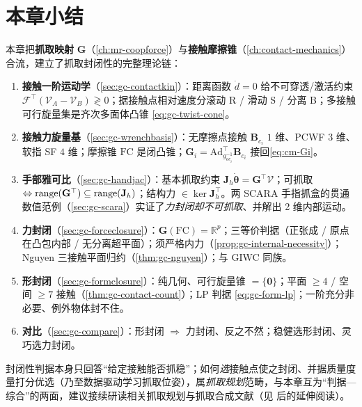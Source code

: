 \section*{本章小结}
本章把\textbf{抓取映射} $\mathbf{G}$（\cref{ch:mr-coopforce}）与\textbf{接触摩擦锥}（\cref{ch:contact-mechanics}）合流，建立了抓取封闭性的完整理论链：
\begin{enumerate}
  \item \textbf{接触一阶运动学}（\cref{sec:gc-contactkin}）：距离函数 $\dot d=0$ 给不可穿透/激活约束 $\mathcal{F}^\top(\mathcal{V}_A-\mathcal{V}_B)\gtrless0$；据接触点相对速度分滚动 R / 滑动 S / 分离 B；多接触可行旋量集是齐次多面体凸锥 \cref{eq:gc-twist-cone}。
  \item \textbf{接触力旋量基}（\cref{sec:gc-wrenchbasis}）：无摩擦点接触 $\mathbf{B}_{c_i}$ $1$ 维、PCWF $3$ 维、软指 SF $4$ 维；摩擦锥 $\mathrm{FC}$ 是闭凸锥；$\mathbf{G}_i=\mathrm{Ad}_{g_{oc_i}^{-1}}^\top\mathbf{B}_{c_i}$ 接回\cref{eq:cm-Gi}。
  \item \textbf{手部雅可比}（\cref{sec:gc-handjac}）：基本抓取约束 $\mathbf{J}_h\dot{\boldsymbol{\theta}}=\mathbf{G}^\top\mathcal{V}$；可抓取 $\Leftrightarrow\operatorname{range}(\mathbf{G}^\top)\subseteq\operatorname{range}(\mathbf{J}_h)$；结构力 $\in\ker\mathbf{J}_h^\top$。两 SCARA 手指抓盒的贯通数值范例（\cref{sec:gc-scara}）实证了\emph{力封闭却不可抓取}、并解出 2 维内部运动。
  \item \textbf{力封闭}（\cref{sec:gc-forceclosure}）：$\mathbf{G}(\mathrm{FC})=\mathbb{R}^p$；三等价判据（正张成 / 原点在凸包内部 / 无分离超平面）；须严格内力（\cref{prop:gc-internal-necessity}）；Nguyen 三接触平面归约（\cref{thm:gc-nguyen}）；与 GIWC 同族。
  \item \textbf{形封闭}（\cref{sec:gc-formclosure}）：纯几何、可行旋量锥 $=\{\mathbf{0}\}$；平面 $\ge4$ / 空间 $\ge7$ 接触（\cref{thm:gc-contact-count}）；LP 判据 \cref{eq:gc-form-lp}；一阶充分非必要、例外物体封不住。
  \item \textbf{对比}（\cref{sec:gc-compare}）：形封闭 $\Rightarrow$ 力封闭、反之不然；稳健选形封闭、灵巧选力封闭。
\end{enumerate}
封闭性判据本身只回答“给定接触能否抓稳”；如何\emph{选}接触点使之封闭、并据质量度量打分优选（乃至数据驱动学习抓取位姿），属\emph{抓取规划}范畴，与本章互为“判据—综合”的两面，建议接续研读相关抓取规划与抓取合成文献（见 后的延伸阅读）。

